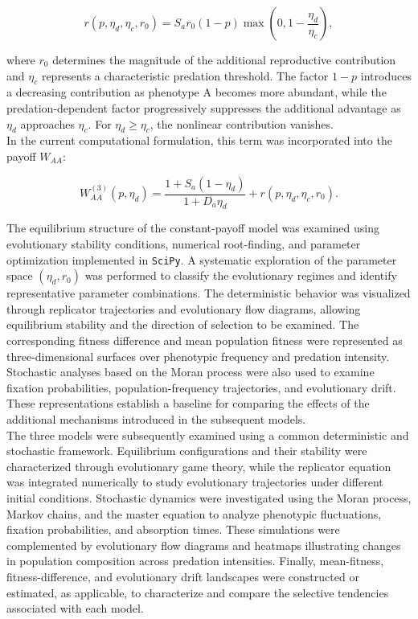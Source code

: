 \begin{equation}
r(p,\eta_d,\eta_c,r_0)
=
S_a r_0(1-p)
\max\left(0,1-\frac{\eta_d}{\eta_c}\right),
\label{eq:nonlinear_reproductive_term}
\end{equation}

where \(r_0\) determines the magnitude of the additional reproductive contribution and \(\eta_c\) represents a characteristic predation threshold.  The factor \(1-p\) introduces a decreasing contribution as phenotype A becomes more abundant, while the predation-dependent factor progressively suppresses the additional advantage as \(\eta_d\) approaches \(\eta_c\). For \(\eta_d\geq\eta_c\), the nonlinear contribution vanishes. \\ 

In the current computational formulation, this term was incorporated into the payoff \(W_{AA}\):

\begin{equation}
W_{AA}^{(3)}(p,\eta_d)
=
\frac{1+S_a(1-\eta_d)}{1+D_a\eta_d}
+
r(p,\eta_d,\eta_c,r_0).
\label{eq:nonlinear_WAA}
\end{equation}


The equilibrium structure of the constant-payoff model was examined using evolutionary stability conditions, numerical root-finding, and parameter optimization implemented in \texttt{SciPy}. A systematic exploration of the parameter space $(\eta_d,r_0)$ was performed to classify the evolutionary regimes and identify representative parameter combinations. The deterministic behavior was visualized through replicator trajectories and evolutionary flow diagrams, allowing equilibrium stability and the direction of selection to be examined. The corresponding fitness difference and mean population fitness were represented as three-dimensional surfaces over phenotypic frequency and predation intensity. Stochastic analyses based on the Moran process were also used to examine fixation probabilities, population-frequency trajectories, and evolutionary drift. These representations establish a baseline for comparing the effects of the additional mechanisms introduced in the subsequent models.  \\ 


The three models were subsequently examined using a common deterministic and stochastic framework. Equilibrium configurations and their stability were characterized through evolutionary game theory, while the replicator equation was integrated numerically to study evolutionary trajectories under different initial conditions. Stochastic dynamics were investigated using the Moran process, Markov chains, and the master equation to analyze phenotypic fluctuations, fixation probabilities, and absorption times. These simulations were complemented by evolutionary flow diagrams and heatmaps illustrating changes in population composition across predation intensities. Finally, mean-fitness, fitness-difference, and evolutionary drift landscapes were constructed or estimated, as applicable, to characterize and compare the selective tendencies associated with each model.\\ 


